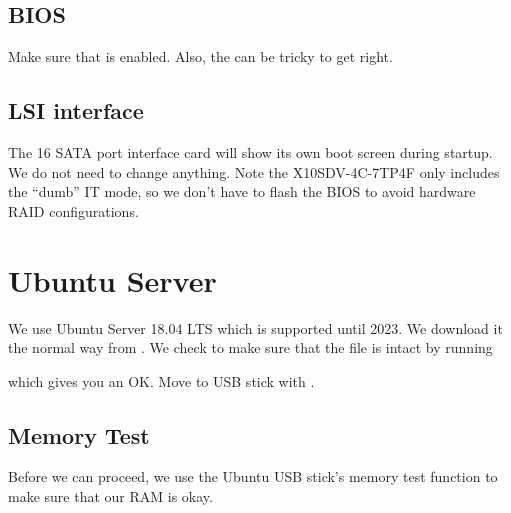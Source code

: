 \documentclass[a4paper,10pt,english]{sphinxmanual}
\begin{document}
\section{BIOS}
\label{\detokenize{hardware:bios}}
Make sure that  is enabled. Also, the 
can be tricky to get right.


\section{LSI interface}
\label{\detokenize{hardware:lsi-interface}}
The 16 SATA port interface card will show its own boot screen during startup. We
do not need to change anything. Note the X10SDV-4C-7TP4F only includes the
“dumb” IT mode, so we don’t have to flash the BIOS to avoid hardware RAID
configurations.


\chapter{Ubuntu Server}
\label{\detokenize{os:ubuntu-server}}\label{\detokenize{os::doc}}
We use Ubuntu Server 18.04 LTS which is supported until 2023. We download it the
normal way from  . We check to make sure
that the file is intact by running

\begin{sphinxVerbatim}[commandchars=\\\{\}]
    
\end{sphinxVerbatim}

which gives you an OK. Move to USB stick with .


\section{Memory Test}
\label{\detokenize{os:memory-test}}
Before we can proceed, we use the Ubuntu USB stick’s memory test function to
make sure that our RAM is okay.

\end{document}
